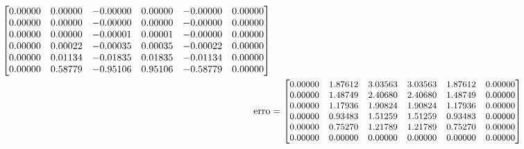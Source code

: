 \documentclass[a4paper, 11pt]{report}
\begin{document}
\begin{enumerate}[leftmargin=*]
\begin{minipage}{0.6\columnwidth}
\begin{align*}
{\begin{bmatrix}
                    0.00000 &  0.00000 & -0.00000 &  0.00000 & -0.00000 & 0.00000\\  
                    0.00000 &  0.00000 & -0.00000 &  0.00000 & -0.00000 & 0.00000\\  
                    0.00000 &  0.00000 & -0.00001 &  0.00001 & -0.00000 & 0.00000\\  
                    0.00000 &  0.00022 & -0.00035 &  0.00035 & -0.00022 & 0.00000\\  
                    0.00000 &  0.01134 & -0.01835 &  0.01835 & -0.01134 & 0.00000\\  
                    0.00000 &  0.58779 & -0.95106 &  0.95106 & -0.58779 & 0.00000\\ 
                \end{bmatrix}}\\
                \text{erro} &= 
                {\small
                \begin{bmatrix}
                    0.00000 &  1.87612  & 3.03563 &  3.03563  & 1.87612  & 0.00000 \\ 
                    0.00000 &  1.48749  & 2.40680 &  2.40680  & 1.48749  & 0.00000 \\ 
                    0.00000 &  1.17936  & 1.90824 &  1.90824  & 1.17936  & 0.00000 \\ 
                    0.00000 &  0.93483  & 1.51259 &  1.51259  & 0.93483  & 0.00000 \\ 
                    0.00000 &  0.75270  & 1.21789 &  1.21789  & 0.75270  & 0.00000 \\ 
                    0.00000 &  0.00000  & 0.00000 &  0.00000  & 0.00000  & 0.00000 \\
                \end{bmatrix}}
            \end{align*}
        \end{minipage}


\end{enumerate}
\end{document}
